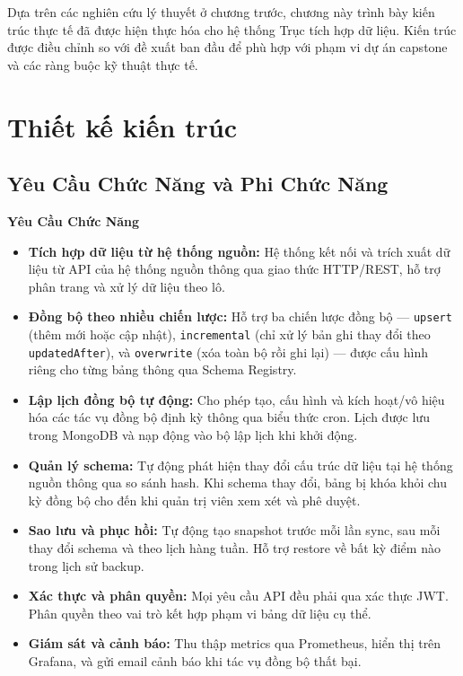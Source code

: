 
Dựa trên các nghiên cứu lý thuyết ở chương trước, chương này trình bày
kiến trúc thực tế đã được hiện thực hóa cho hệ thống Trục tích hợp dữ
liệu. Kiến trúc được điều chỉnh so với đề xuất ban đầu để phù hợp với
phạm vi dự án capstone và các ràng buộc kỹ thuật thực tế.

\section{Thiết kế kiến trúc}

\subsection{Yêu Cầu Chức Năng và Phi Chức Năng}

\textbf{Yêu Cầu Chức Năng}

\begin{itemize}
    \item \textbf{Tích hợp dữ liệu từ hệ thống nguồn:} Hệ thống kết nối
    và trích xuất dữ liệu từ API của hệ thống nguồn thông qua giao thức
    HTTP/REST, hỗ trợ phân trang và xử lý dữ liệu theo lô.

    \item \textbf{Đồng bộ theo nhiều chiến lược:} Hỗ trợ ba chiến lược
    đồng bộ — \texttt{upsert} (thêm mới hoặc cập nhật), \texttt{incremental}
    (chỉ xử lý bản ghi thay đổi theo \texttt{updatedAfter}), và
    \texttt{overwrite} (xóa toàn bộ rồi ghi lại) — được cấu hình riêng cho
    từng bảng thông qua Schema Registry.

    \item \textbf{Lập lịch đồng bộ tự động:} Cho phép tạo, cấu hình và
    kích hoạt/vô hiệu hóa các tác vụ đồng bộ định kỳ thông qua biểu thức
    cron. Lịch được lưu trong MongoDB và nạp động vào bộ lập lịch khi khởi
    động.

    \item \textbf{Quản lý schema:} Tự động phát hiện thay đổi cấu trúc dữ
    liệu tại hệ thống nguồn thông qua so sánh hash. Khi schema thay đổi,
    bảng bị khóa khỏi chu kỳ đồng bộ cho đến khi quản trị viên xem xét và
    phê duyệt.

    \item \textbf{Sao lưu và phục hồi:} Tự động tạo snapshot trước mỗi lần
    sync, sau mỗi thay đổi schema và theo lịch hàng tuần. Hỗ trợ restore
    về bất kỳ điểm nào trong lịch sử backup.

    \item \textbf{Xác thực và phân quyền:} Mọi yêu cầu API đều phải qua
    xác thực JWT. Phân quyền theo vai trò kết hợp phạm vi bảng dữ liệu
    cụ thể.

    \item \textbf{Giám sát và cảnh báo:} Thu thập metrics qua Prometheus,
    hiển thị trên Grafana, và gửi email cảnh báo khi tác vụ đồng bộ thất
    bại.
\end{itemize}

